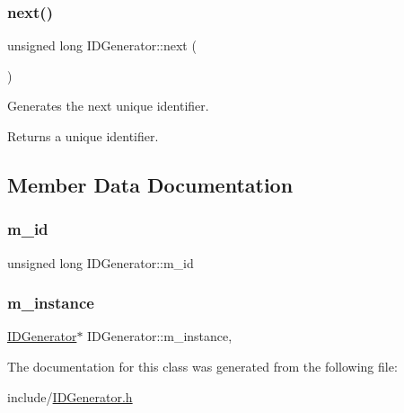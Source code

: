 \subsubsection{\texorpdfstring{next()}{next()}}
{\footnotesize\ttfamily unsigned long I\+D\+Generator\+::next (\begin{DoxyParamCaption}{ }\end{DoxyParamCaption})\hspace{0.3cm}{\ttfamily [inline]}}

Generates the next unique identifier. \begin{DoxyReturn}{Returns}
a unique identifier. 
\end{DoxyReturn}


\subsection{Member Data Documentation}
\mbox{\label{class_i_d_generator_ad0400380525f694b23ff675f4f170893}} 
\subsubsection{\texorpdfstring{m\+\_\+id}{m\_id}}
{\footnotesize\ttfamily unsigned long I\+D\+Generator\+::m\+\_\+id\hspace{0.3cm}{\ttfamily [private]}}

\mbox{\label{class_i_d_generator_a316bacdda67f4cf9bf73fcbd9bf94245}} 
\subsubsection{\texorpdfstring{m\+\_\+instance}{m\_instance}}
{\footnotesize\ttfamily \hyperlink{class_i_d_generator}{I\+D\+Generator}$\ast$ I\+D\+Generator\+::m\+\_\+instance\hspace{0.3cm}{\ttfamily [static]}, {\ttfamily [private]}}



The documentation for this class was generated from the following file\+:\begin{DoxyCompactItemize}
\item 
include/\hyperlink{_i_d_generator_8h}{I\+D\+Generator.\+h}\end{DoxyCompactItemize}
